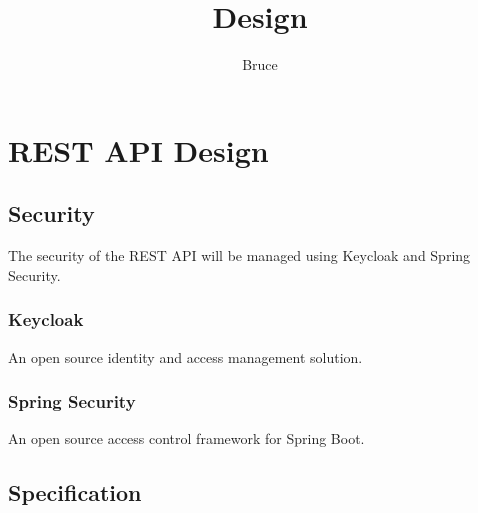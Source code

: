 \documentclass[]{article}
\title{Design}
\author{Bruce}
\date{}
\begin{document}
\maketitle

\section{REST API Design}

\subsection{Security}
The security of the REST API will be managed using Keycloak and Spring Security.

\subsubsection{Keycloak}
An open source identity and access management solution.
\subsubsection{Spring Security}
An open source access control framework for Spring Boot.

\subsection{Specification}
\end{document}
